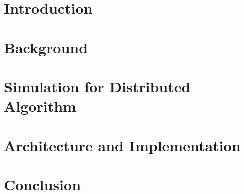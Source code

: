 \documentclass[pdftex,12pt]{report}
\begin{document}
%

\tableofcontents
\listoffigures
{}
\listoftables
{}


\chapter{Introduction}



\chapter{Background}



\chapter{Simulation for Distributed Algorithm}



\chapter{Architecture and Implementation}



\chapter{Conclusion}






\end{document}
